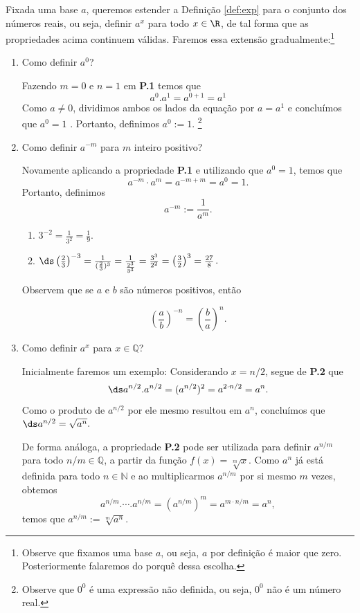 Fixada uma base $a$, queremos estender a Definição \ref{def:exp} para o conjunto dos números reais, ou seja,  definir $a^x$ para todo $x\in\R$, de tal forma que as propriedades acima continuem válidas.
Faremos essa extensão gradualmente:\footnote{Observe que fixamos uma base $a$, ou seja, $a$ por definição é maior que zero. Posteriormente falaremos do porquê dessa escolha.}
\begin{enumerate}
	\item Como definir $a^0$?

	Fazendo $m=0$ e $n=1$ em \textbf{P.1} temos que
	\[a^0.a^1=a^{0+1}=a^1\]
	Como $a\neq 0$, dividimos ambos os lados da equação por $a=a^1$ e concluímos que $a^0=1$ . Portanto, definimos $a^0:=1$. \footnote{Observe que $0^0$ é uma expressão não definida, ou seja, $0^0$ não é um número real. }
	\item Como definir $a^{-m}$ para $m$ inteiro positivo?

	Novamente aplicando a propriedade \textbf{P.1} e utilizando que $a^0=1$, temos que \[a^{-m}\cdot a^{m}=a^{-m+m}=a^0=1.\]
	Portanto, definimos
	\begin{equation}
	\label{def: nun neg}
	a^{-m}:=\frac{1}{a^m}.
	\end{equation}

	\begin{exe}

	\begin{enumerate}
	\item  \color{red}$3^{-2}=\frac{1}{3^2}=\frac{1}{9}.$ \color{black}
	\item \color{red}$\ds \left(\frac{2}{3}\right)^{-3}=\frac{1}{(\frac{2}{3})^3}=\frac{1}{\frac{2^3}{3^3}}=\frac{3^3}{2^2}=\left(\frac{3}{2}\right)^{3}=\frac{27}{8}$. \color{black}
	\end{enumerate}
	\end{exe}
	Observem que se $a$ e $b$ são números positivos, então

	$$\left(\frac{a}{b}\right)^{-n}=\left(\frac{b}{a}\right)^{n}.$$

		\item Como definir $a^x$ para $x\in\mathbb{Q}$?

	Inicialmente faremos um exemplo: Considerando $x=n/2$, segue de \textbf{P.2} que \[\ds a^{n/2}.a^{n/2}=(a^{n/2})^2=a^{2\cdot n/2}=a^n.\]
	Como o produto de $a^{n/2}$ por ele mesmo resultou em $a^n$, concluímos que $\ds a^{n/2}=\sqrt{a^n}.$

	De forma análoga, a propriedade \textbf{P.2} pode ser utilizada para definir $a^{n/m}$ para todo $n/m\in\mathbb{Q}$, a partir da função $f(x)=\sqrt[m]{x}$. Como $a^n$ já está definida para todo $n\in\mathbb{N}$ e ao multiplicarmos $a^{n/m}$ por si mesmo $m$ vezes, obtemos
	\[ a^{n/m}.\cdots.a^{n/m}=(a^{n/m})^m=a^{m \cdot n/m}=a^n,\]
	temos que
	$a^{n/m}:=\sqrt[m]{a^n}$.


\end{enumerate}
